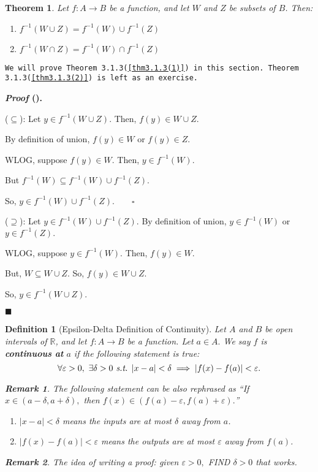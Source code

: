 \documentclass[12pt,a4paper]{article}
\newtheorem{thm}{Theorem}[subsection]
\newtheorem{df}{Definition}[subsection]
\newcounter{nprf}[subsection]
\newtheorem*{rmk}{\indent Remark}
\newenvironment*{prf}{\par\indent\textbf{\textit{Proof} (\stepcounter{nprf}\thenprf). }\par }{\par\hfill $\blacksquare$\par}
\def\R{{\mathbb{R}}}
\def\f{f^{-1}}
\def\st{\emph{ s.t. }}
\begin{document}
\begin{thm}
	Let $f:A\to B$ be a function, and let $W$ and $Z$ be subsets of $B$. Then: 
	\begin{enumerate}
		\item\label{thm3.1.3(1)} $\f(W\cup Z)=\f(W)\cup \f(Z)$
		\item\label{thm3.1.3(2)} $\f(W\cap Z)=\f(W)\cap \f(Z)$
	\end{enumerate}	
\end{thm}
\begin{framed}
\noindent\texttt{We will prove Theorem 3.1.3(\ref{thm3.1.3(1)}) in this section. Theorem 3.1.3(\ref{thm3.1.3(2)}) is left as an exercise.}
\begin{prf}
	($\subseteq$): Let $y\in\f(W\cup Z).$ Then, $f(y)\in W\cup Z.$\par\hspace{5mm} By definition of union, $f(y)\in W$ or $f(y)\in Z.$\par\hspace{5mm} WLOG, suppose $f(y)\in W.$ Then, $y\in\f(W).$\par\hspace{5mm} But $\f(W)\subseteq\f(W)\cup\f(Z).$\par\hspace{5mm} So, $y\in\f(W)\cup\f(Z).\qquad\square$\par 
	($\supseteq$): Let $y\in\f(W)\cup\f(Z).$ By definition of union, $y\in\f(W)$ or $y\in\f(Z).$\par\hspace{5mm} WLOG, suppose $y\in\f(W).$ Then, $f(y)\in W.$\par\hspace{5mm} But, $W\subseteq W\cup Z.$ So, $f(y)\in W\cup Z.$\par\hspace{5mm} So, $y\in\f(W\cup Z).$
\end{prf}
\end{framed}
\begin{df}[Epsilon-Delta Definition of Continuity]\label{df3.1.4}
	Let $A$ and $B$ be open intervals of $\R$, and let $f:A\to B$ be a function. Let $a\in A.$ We say $f$ is \textbf{continuous at} $a$ if the following statement is true: \[\forall\varepsilon>0,\ \exists\delta>0\st|x-a|<\delta\implies|f(x)-f(a)|<\varepsilon.\]
	\begin{rmk} The following statement can be also rephrased as ``If $x\in(a-\delta,a+\delta),$ then $f(x)\in(f(a)-\varepsilon,f(a)+\varepsilon).$''\end{rmk}
	\begin{enumerate}
		\item $|x-a|<\delta$ means the inputs are at most $\delta$ away from $a$.
		\item $|f(x)-f(a)|<\varepsilon$ means the outputs are at most $\varepsilon$ away from $f(a)$.	
	\end{enumerate}
	\begin{rmk}
		The idea of writing a proof: given $\varepsilon>0,$ FIND $\delta>0$ that works.	
	\end{rmk}
\end{df}
\end{document}
